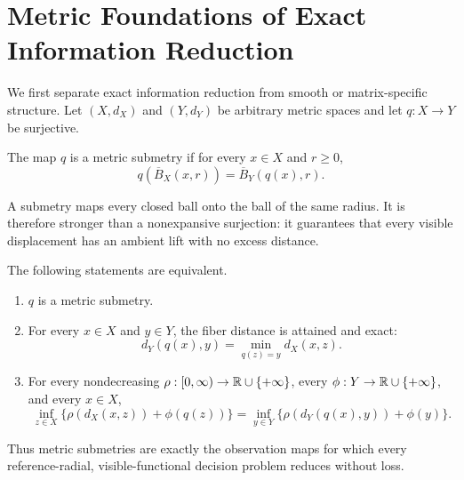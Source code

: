 \section{Metric Foundations of Exact Information Reduction}
\label{sec:metric-foundations}

We first separate exact information reduction from smooth or matrix-specific
structure.  Let \((X,d_X)\) and \((Y,d_Y)\) be arbitrary metric spaces and let
\(q:X\to Y\) be surjective.

\begin{definition}
\label{def:metric-submetry}
The map \(q\) is a metric submetry if for every \(x\in X\) and \(r\ge0\),
\begin{equation}
  q(\overline B_X(x,r))=\overline B_Y(q(x),r).
  \label{eq:metric-submetry}
\end{equation}
\end{definition}

A submetry maps every closed ball onto the ball of the same radius.  It is
therefore stronger than a nonexpansive surjection: it guarantees that every
visible displacement has an ambient lift with no excess distance.

\begin{theorem}
\label{thm:metric-characterization}
The following statements are equivalent.
\begin{enumerate}[label=(\Alph*),leftmargin=*]
  \item \(q\) is a metric submetry.
  \item For every \(x\in X\) and \(y\in Y\), the fiber distance is attained
  and exact:
  \begin{equation}
    d_Y(q(x),y)=\min_{q(z)=y}d_X(x,z).
    \label{eq:exact-fiber-distance}
  \end{equation}
  \item For every nondecreasing
  \(\rho:[0,\infty)\to\mathbb R\cup\{+\infty\}\), every
  \(\phi:Y\to\mathbb R\cup\{+\infty\}\), and every \(x\in X\),
  \begin{equation}
    \boxed{
    \inf_{z\in X}\{\rho(d_X(x,z))+\phi(q(z))\}
    =
    \inf_{y\in Y}\{\rho(d_Y(q(x),y))+\phi(y)\}.}
    \label{eq:universal-radial-reduction}
  \end{equation}
\end{enumerate}
Thus metric submetries are exactly the observation maps for which every
reference-radial, visible-functional decision problem reduces without loss.
\end{theorem}

